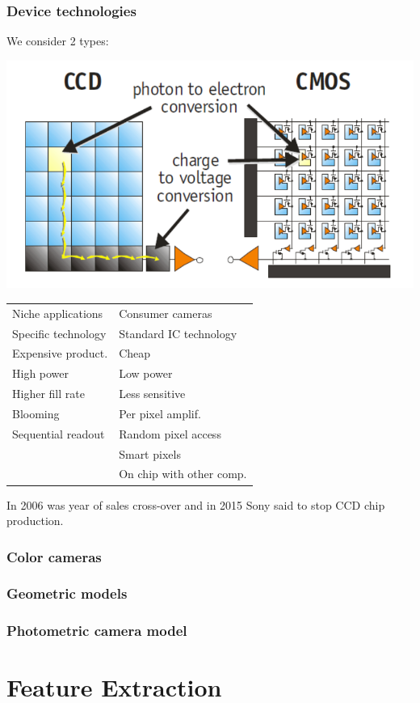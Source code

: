 \documentclass[a4paper, fontsize=8pt, landscape, DIV=1]{scrartcl}
\begin{document}
\begin{multicols*}{4}
		\subsubsection{Device technologies}
		We consider 2 types: 
		\begin{center}
			\includegraphics[width=0.7\columnwidth]{images//ImageAcq/ccd_cmos.png}\\
		\end{center}
		\begin{tabular}{l l}
			\hline 
			\hline
			\thead{CCD} &  \thead{CMOS}  \\ 
			\hline
			Niche applications    & Consumer cameras  \\ 
			Specific technology   & Standard IC technology\\ 
			Expensive product.	  & Cheap \\ 
			High power 			  & Low power \\ 
			Higher fill rate 	  & Less sensitive  \\ 
			Blooming			  & Per pixel amplif. \\ 
			Sequential readout	  & Random pixel access\\ 
								  & Smart pixels \\
								  & On chip with other comp.\\
			\hline 
			\hline
		\end{tabular}
		\par
		In 2006 was year of sales cross-over and in 2015 Sony said to stop CCD chip production. 
		\subsubsection{Color cameras}
		\subsubsection{Geometric models}
		\subsubsection{Photometric camera model}
		\section{Feature Extraction}	
		
		 
		
	\end{multicols*}
	\setcounter{secnumdepth}{3}
\end{document}
